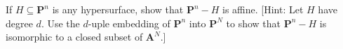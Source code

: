 If $H \subseteq \mathbf{P}^n$ is any hypersurface, show that $\mathbf{P}^n - H$ is affine. [Hint: Let $H$ have degree $d$. Use the $d$-uple embedding of $\mathbf{P}^n$ into $\mathbf{P}^N$ to show that $\mathbf{P}^n - H$ is isomorphic to a closed subset of $\mathbf{A}^N$.]
